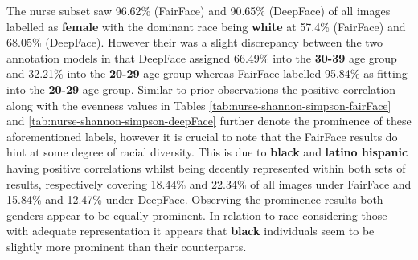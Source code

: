 
The nurse subset saw 96.62\% (FairFace) and 90.65\% (DeepFace) of all images labelled as \textbf{female} with the dominant race being \textbf{white} at 57.4\% (FairFace) and 68.05\% (DeepFace). However their was a slight discrepancy between the two annotation models in that DeepFace assigned 66.49\% into the \textbf{30-39} age group and 32.21\% into the \textbf{20-29} age group whereas FairFace labelled 95.84\% as fitting into the \textbf{20-29} age group. Similar to prior observations the positive correlation along with the evenness values in Tables \ref{tab:nurse-shannon-simpson-fairFace} and \ref{tab:nurse-shannon-simpson-deepFace} further denote the prominence of these aforementioned labels, however it is crucial to note that the FairFace results do hint at some degree of racial diversity. This is due to \textbf{black} and \textbf{latino hispanic} having positive correlations whilst being decently represented within both sets of results, respectively covering 18.44\% and 22.34\% of all images under FairFace and 15.84\% and 12.47\% under DeepFace. Observing the prominence results both genders appear to be equally prominent. In relation to race considering those with adequate representation it appears that \textbf{black} individuals seem to be slightly more prominent than their counterparts.   

